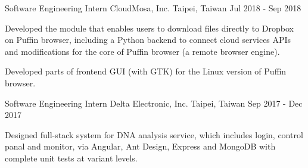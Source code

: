 \begin{cventries}
    \vspace{-2mm}


  \cventry
    {Software Engineering Intern} %
    {CloudMosa, Inc.} %
    {Taipei, Taiwan} %
    {Jul 2018 - Sep 2018} %
    {
      \begin{cvitems} %
        \item {Developed the module that enables users to download files directly to Dropbox on Puffin browser,
        including a Python backend to connect cloud services APIs and modifications for the core of Puffin browser (a remote browser engine).}
        \item {Developed parts of frontend GUI (with GTK) for the Linux version of Puffin browser.}
      \end{cvitems}
    }

    \vspace{-2mm}


  \cventry
    {Software Engineering Intern} %
    {Delta Electronic, Inc.} %
    {Taipei, Taiwan} %
    {Sep 2017 - Dec 2017} %
    {
      \begin{cvitems} %
        \item {Designed full-stack system for DNA analysis service, which includes login, control panal and monitor,
        via Angular, Ant Design, Express and MongoDB with complete unit tests at variant levels.}
      \end{cvitems}
    }

    \vspace{-2mm}



\end{cventries}
